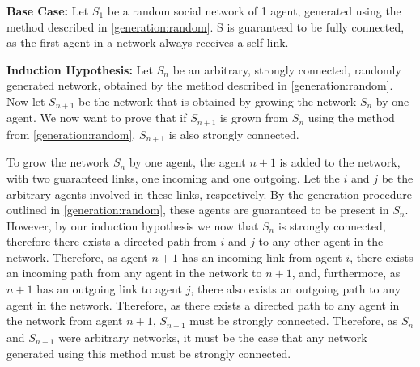 \documentclass{article}
\begin{document}
\textbf{Base Case:} \newline
Let $S_1$ be a random social network of 1 agent, generated using the method described in \ref{generation:random}.
S is guaranteed to be fully connected, as the first agent in a network always receives a self-link.\newline

\textbf{Induction Hypothesis:}\newline
Let $S_n$ be an arbitrary, strongly connected, randomly generated network, obtained by the method described in \ref{generation:random}. Now let $S_{n+1}$ be the network that is obtained by growing the network $S_n$ by one agent. We now want to prove that if $S_{n+1}$ is grown from $S_n$ using the method from \ref{generation:random}, $S_{n+1}$ is also strongly connected.\newline

To grow the network $S_n$ by one agent, the agent $n+1$ is added to the network, with two guaranteed links, one incoming and one outgoing. Let the $i$ and $j$ be the arbitrary agents involved in these links, respectively. By the generation procedure outlined in \ref{generation:random}, these agents are guaranteed to be present in $S_n$. However, by our induction hypothesis we now that $S_n$ is strongly connected, therefore there exists a directed path from $i$ and $j$ to any other agent in the network. Therefore, as agent $n+1$ has an incoming link from agent $i$, there exists an incoming path from any agent in the network to $n+1$, and, furthermore, as $n+1$ has an outgoing link to agent $j$, there also exists an outgoing path to any agent in the network. Therefore, as there exists a directed path to any agent in the network from agent $n+1$, $S_{n+1}$ must be strongly connected.\newline
Therefore, as $S_n$ and $S_{n+1}$ were arbitrary networks, it must be the case that any network generated using this method must be strongly connected.\newline




\newpage
\end{document}
